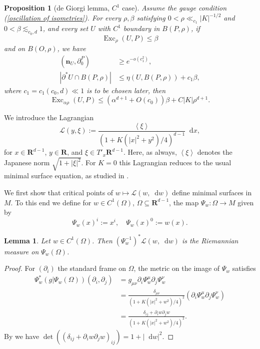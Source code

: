\documentclass[final,12pt, leqno]{brownthesis}
\newcommand{\RR}{\mathbf{R}}
\DeclareMathOperator{\Exc}{Exc}
\newcommand*\dif{\mathop{}\!\mathrm{d}}
\newcommand{\Lagrange}{\mathscr L}
\newcommand{\normal}{\mathbf n}
\def\Japan#1{\left \langle #1 \right \rangle}
\newtheorem{lemma}[theorem]{Lemma}
\newtheorem{proposition}[theorem]{Proposition}
\theoremstyle{definition}
\numberwithin{equation}{section}
\begin{document}
\begin{proposition}[de Giorgi lemma, $C^1$ case]\label{Miranda44}
Assume the gauge condition (\ref{oscillation of isometries}).
For every $\rho, \beta$ satisfying $0 < \rho \ll_{c_1} |K|^{-1/2}$ and $0 < \beta \lesssim_{c_0, d} 1$, and every set $U$ with $C^1$ boundary in $B(P, \rho)$, if
$$\Exc_\rho(U, P) \leq \beta$$
and on $B(O, \rho)$, we have
\begin{align}
(\normal_U, \partial_0^P) &\geq e^{-o(c_1^2)}, \label{Miranda44 normal hyp} \\
|\partial^* U \cap B(P, \rho)| &\leq \eta(U, B(P, \rho)) + c_1 \beta, \label{Miranda44 minimality hyp}
\end{align}
where $c_1 = c_1(c_0, d) \ll 1$ is to be chosen later, then
\begin{equation}\label{Miranda44 concl}
\Exc_{\alpha \rho} (U, P) \leq (\alpha^{d + 1} + O(c_0)) \beta + C|K|\rho^{d + 1}.
\end{equation}
\end{proposition}

We introduce the Lagrangian
$$\Lagrange(y, \xi) := \frac{\Japan{\xi}}{(1 + K(|x|^2 + y^2)/4)^{d - 1}} \dif x,$$
for $x \in \RR^{d - 1}$, $y \in \RR$, and $\xi \in T'_x \RR^{d - 1}$.
Here, as always, $\Japan \xi$ denotes the Japanese norm $\sqrt{1 + |\xi|^2}$.
For $K = 0$ this Lagrangian reduces to the usual minimal surface equation, as studied in \cite[Chapter 6]{Giusti77}.

We first show that critical points of $w \mapsto \Lagrange(w, \dif w)$ define minimal surfaces in $M$.
To this end we define for $w \in C^1(\Omega)$, $\Omega \subseteq \RR^{d - 1}$, the map $\Psi_w: \Omega \to M$ given by
$$\Psi_w(x)^i := x^i, \quad \Psi_w(x)^0 := w(x).$$

\begin{lemma}\label{Plateau setup lemma}
Let $w \in C^1(\Omega)$. Then $(\Psi_w^{-1})^* \Lagrange(w, \dif w)$ is the Riemannian measure on $\Psi_w(\Omega)$.
\end{lemma}
\begin{proof}
For $(\partial_i)$ the standard frame on $\Omega$, the metric on the image of $\Psi_w$ satisfies
\begin{align*}
\Psi_w^*(g|\Psi_w(\Omega))(\partial_i, \partial_j) &= g_{\mu\nu} \partial_i \Psi_w^\mu \partial_j \Psi_w^\nu \\
&= \frac{\delta_{\mu\nu}}{(1 + K(|x|^2 + w^2)/4)^2} (\partial_i \Psi_w^\mu \partial_j \Psi_w^\nu) \\
&= \frac{\delta_{ij} + \partial_i w \partial_j w}{(1 + K(|x|^2 + w^2)/4)^2}.
\end{align*}
By \cite[(24)]{Petersen2008} we have $\det((\delta_{ij} + \partial_i w \partial_j w)_{ij}) = 1 + |\dif w|^2$.
\end{proof}
\end{document}
